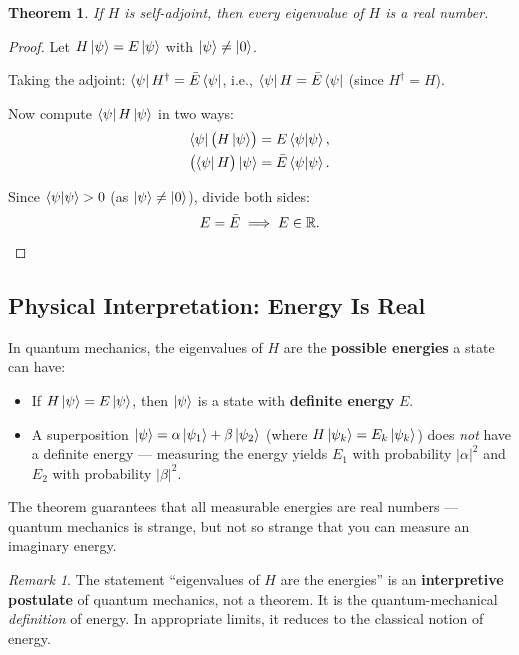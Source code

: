 \documentclass[11pt,a4paper]{article}
\theoremstyle{definition}
\theoremstyle{plain}
\newtheorem{theorem}{Theorem}[section]
\theoremstyle{remark}
\newtheorem{remark}{Remark}[section]
\begin{document}
\begin{theorem}
    If $H$ is self-adjoint, then every eigenvalue of $H$ is a real number.
\end{theorem}

\begin{proof}
    Let $H\ket{\psi} = E\ket{\psi}$ with $\ket{\psi} \neq \ket{0}$.

    Taking the adjoint: $\bra{\psi}H^\dagger = \bar{E}\bra{\psi}$, i.e., $\bra{\psi}H = \bar{E}\bra{\psi}$ (since $H^\dagger = H$).

    Now compute $\bra{\psi}H\ket{\psi}$ in two ways:
    \begin{align}
        \bra{\psi}\bigl(H\ket{\psi}\bigr) &= E\braket{\psi}{\psi}, \\
        \bigl(\bra{\psi}H\bigr)\ket{\psi} &= \bar{E}\braket{\psi}{\psi}.
    \end{align}

    Since $\braket{\psi}{\psi} > 0$ (as $\ket{\psi} \neq \ket{0}$), divide both sides:
    \[
        E = \bar{E} \implies E \in \mathbb{R}. \qedhere
    \]
\end{proof}

\subsection{Physical Interpretation: Energy Is Real}

In quantum mechanics, the eigenvalues of $H$ are the \textbf{possible energies} a state can have:
\begin{itemize}
    \item If $H\ket{\psi} = E\ket{\psi}$, then $\ket{\psi}$ is a state with \textbf{definite energy} $E$.
    \item A superposition $\ket{\psi} = \alpha\ket{\psi_1} + \beta\ket{\psi_2}$ (where $H\ket{\psi_k} = E_k\ket{\psi_k}$) does \emph{not} have a definite energy --- measuring the energy yields $E_1$ with probability $|\alpha|^2$ and $E_2$ with probability $|\beta|^2$.
\end{itemize}

The theorem guarantees that all measurable energies are real numbers --- quantum mechanics is strange, but not so strange that you can measure an imaginary energy.

\begin{remark}
    The statement ``eigenvalues of $H$ are the energies'' is an \textbf{interpretive postulate} of quantum mechanics, not a theorem. It is the quantum-mechanical \emph{definition} of energy. In appropriate limits, it reduces to the classical notion of energy.
\end{remark}
\end{document}
